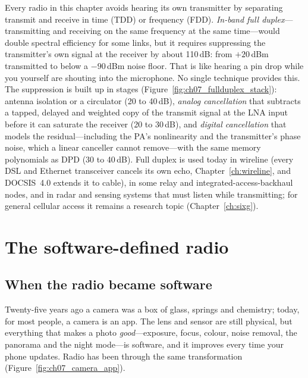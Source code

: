 Every radio in this chapter avoids hearing its own transmitter by separating transmit and receive in
time (TDD) or frequency (FDD). \emph{In-band full duplex}---transmitting and receiving on the same
frequency at the same time---would double spectral efficiency for some links, but it requires suppressing
the transmitter's own signal at the receiver by about 110\,dB: from $+20$\,dBm transmitted to below a
$-90$\,dBm noise floor. That is like hearing a pin drop while you yourself are shouting into the
microphone. No single technique provides this. The suppression is built up in stages
(Figure~\ref{fig:ch07_fullduplex_stack}): antenna isolation or a circulator (20 to 40\,dB), \emph{analog
cancellation} that subtracts a tapped, delayed and weighted copy of the transmit signal at the LNA input
before it can saturate the receiver (20 to 30\,dB), and \emph{digital cancellation} that models the
residual---including the PA's nonlinearity and the transmitter's phase noise, which a linear canceller
cannot remove---with the same memory polynomials as DPD (30 to 40\,dB). Full duplex is used today in
wireline (every DSL and Ethernet transceiver cancels its own echo, Chapter~\ref{ch:wireline}, and
DOCSIS~4.0 extends it to cable), in some relay and integrated-access-backhaul nodes, and in radar and
sensing systems that must listen while transmitting; for general cellular access it remains a research
topic (Chapter~\ref{ch:sixg}).


\section{The software-defined radio}
\label{sec:ch07:sdr}

\subsection{When the radio became software}

Twenty-five years ago a camera was a box of glass, springs and chemistry; today, for most people, a
camera is an app. The lens and sensor are still physical, but everything that makes a photo
\emph{good}---exposure, focus, colour, noise removal, the panorama and the night mode---is software,
and it improves every time your phone updates. Radio has been through the same transformation
(Figure~\ref{fig:ch07_camera_app}).

